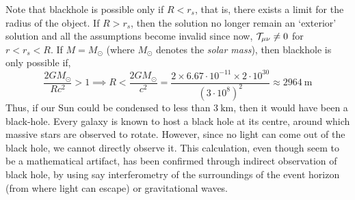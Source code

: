 Note that blackhole is possible only if $R<r_s$, that is, there exists a limit for the radius of the object. If $R>r_s$, then the solution no longer remain an `exterior' solution and all the assumptions become invalid since now, $\mathcal T_{\mu\nu}\neq 0$ for $r<r_s<R$. If $M=M_{\odot}$ (where $M_{\odot}$ denotes the \textit{solar mass}), then blackhole is only possible if,
$$\frac{2GM_\odot}{Rc^2}>1 \implies R<\frac{2GM_\odot}{c^2} = \frac{2\times 6.67\cdot 10^{-11}\times 2\cdot 10^30}{(3\cdot 10^8)^2}\approx 2964\ \text{m}$$
Thus, if our Sun could be condensed to less than $3 \ \mathrm{km}$, then it would have been a black-hole.
Every galaxy is known to host a black hole at its centre, around which massive stars are observed to rotate. However, since no light can come out of the black hole, we cannot directly observe it. This calculation, even though seem to be a mathematical artifact, has been confirmed through indirect observation of black hole, by using say interferometry of the surroundings of the event horizon (from where light can escape) or gravitational waves. 